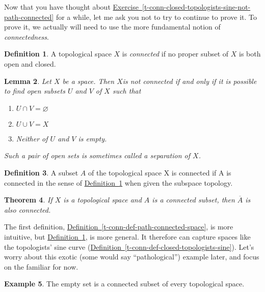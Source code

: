 \documentclass[10pt,]{article}
\theoremstyle{plain}
\newtheorem{theorem}{Theorem}[section]
\newtheorem{lemma}[theorem]{Lemma}
\theoremstyle{definition}
\newtheorem{definition}[theorem]{Definition}
\newtheorem{example}[theorem]{Example}
\begin{document}
Now that you have thought about \hyperref[t-conn-closed-topologists-sine-not-path-connected]{Exercise~\ref{t-conn-closed-topologists-sine-not-path-connected}} for a while, let me ask you not to try to continue to prove it. To prove it, we actually will need to use the more fundamental notion of \emph{connectedness}.%
\begin{definition}\label{t-conn-def-connected-space}
A topological space \(X\) is \emph{connected} if no proper subset of \(X\) is both open and closed.%
\end{definition}
\begin{lemma}\label{t-conn-recognize-disconnected}
Let \(X\) be a space. Then \(X\)is not connected if and only if it is possible to find open subsets \(U\) and \(V\) of \(X\) such that%
\leavevmode%
\begin{enumerate}
\item\hypertarget{li-1}{}\(U \cap V = \varnothing\)\item\hypertarget{li-2}{}\(U \cup V = X\)\item\hypertarget{li-3}{}Neither of \(U\) and \(V\) is empty.\end{enumerate}
\par
Such a pair of open sets is sometimes called a \emph{separation} of \(X\).%
\end{lemma}
\begin{definition}\label{t-conn-def-connected-set}
A subset \(A\) of the topological space X is connected if A is connected in the sense of \hyperref[t-conn-def-connected-space]{Definition~\ref{t-conn-def-connected-space}} when given the subspace topology.%
\end{definition}
\begin{theorem}\label{t-conn-closure-of-connected}
If \(X\) is a topological space and \(A\) is a connected subset, then \(\overline{A}\) is also connected.%
\end{theorem}
\par
The first definition, \hyperref[t-conn-def-path-connected-space]{Definition~\ref{t-conn-def-path-connected-space}}, is more intuitive, but \hyperref[t-conn-def-connected-space]{Definition~\ref{t-conn-def-connected-space}}, is more general. It therefore can capture spaces like the topologists' sine curve (\hyperref[t-conn-def-closed-topologists-sine]{Definition~\ref{t-conn-def-closed-topologists-sine}}). Let's worry about this exotic (some would say ``pathological'') example later, and focus on the familiar for now.%
\begin{example}\label{t-conn-empty-is-connected}
The empty set is a connected subset of every topological space.%
\end{example}
\end{document}

